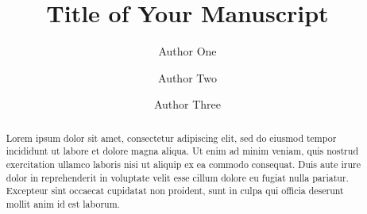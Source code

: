 \documentclass[preprint,12pt]{elsarticle}
\begin{document}
\begin{frontmatter}



\title{Title of Your Manuscript}


\author[inst1]{Author One}


\author[inst2]{Author Two}
\author[inst1,inst2]{Author Three}


\begin{abstract}
Lorem ipsum dolor sit amet, consectetur adipiscing elit, sed do eiusmod tempor incididunt ut labore et dolore magna aliqua. Ut enim ad minim veniam, quis nostrud exercitation ullamco laboris nisi ut aliquip ex ea commodo consequat. Duis aute irure dolor in reprehenderit in voluptate velit esse cillum dolore eu fugiat nulla pariatur. Excepteur sint occaecat cupidatat non proident, sunt in culpa qui officia deserunt mollit anim id est laborum.
\end{abstract}


\end{frontmatter}
\end{document}
